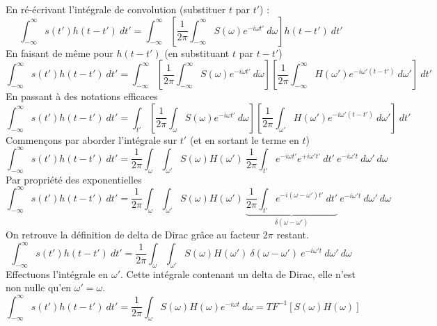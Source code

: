 En ré-écrivant l'intégrale de convolution (substituer $t$ par $t'$) :
\begin{equation}
\int_{-\infty}^\infty s(t')h(t-t')\ dt' = \int_{-\infty}^\infty \left[\dfrac{1}{2\pi}
\int_{-\infty}^\infty S(\omega)e^{-i\omega t'}\ d\omega\right]h(t-t')\ dt'
\end{equation}
En faisant de même pour $h(t-t')$ (en substituant $t$ par $t-t'$)
\begin{equation}
\int_{-\infty}^\infty s(t')h(t-t')\ dt' = \int_{-\infty}^\infty \left[\dfrac{1}{2\pi}
\int_{-\infty}^\infty S(\omega)e^{-i\omega t'}\ d\omega\right]\left[\frac{1}{2\pi}
\int_{-\infty}^\infty H(\omega')e^{-i\omega'(t-t')}\ d\omega' \right]\ dt'
\end{equation}
En passant à des notations efficaces
\begin{equation}
\int_{-\infty}^\infty s(t')h(t-t')\ dt' = \int_{t'} \left[\dfrac{1}{2\pi}
\int_{\omega} S(\omega)e^{-i\omega t'}\ d\omega\right]\left[\frac{1}{2\pi}
\int_{\omega'} H(\omega')e^{-i\omega'(t-t')}\ d\omega' \right]\ dt'
\end{equation}
Commençons par aborder l'intégrale sur $t'$ (et en sortant le terme en $t$)
\begin{equation}
\int_{-\infty}^\infty s(t')h(t-t')\ dt' = \frac{1}{2\pi}\int_\omega\int_{\omega'}
S(\omega)H(\omega')\ \frac{1}{2\pi}\int_{t'}e^{-i\omega t'}e^{+i\omega't'}\ dt'\ e^{-i
\omega' t}\ d\omega'\ d\omega
\end{equation}
Par propriété des exponentielles
\begin{equation}
\int_{-\infty}^\infty s(t')h(t-t')\ dt' = \frac{1}{2\pi}\int_\omega\int_{\omega'}
S(\omega)H(\omega')\ \underbrace{\frac{1}{2\pi}\int_{t'}e^{-i(\omega-\omega')t'}\ dt'}_{\delta
(\omega-\omega')}\ e^{-i
\omega' t}\ d\omega'\ d\omega
\end{equation}
On retrouve la définition de delta de Dirac grâce au facteur $2\pi$ restant.
\begin{equation}
\int_{-\infty}^\infty s(t')h(t-t')\ dt' = \frac{1}{2\pi}\int_\omega\int_{\omega'}
S(\omega)H(\omega')\ \delta(\omega-\omega')\ e^{-i\omega' t}\ d\omega'\ d\omega
\end{equation}
Effectuons l'intégrale en $\omega'$. Cette intégrale contenant un delta de Dirac, elle 
n'est non nulle qu'en $\omega'=\omega$. 
\begin{equation}
\int_{-\infty}^\infty s(t')h(t-t')\ dt' = \frac{1}{2\pi}\int_\omega
S(\omega)H(\omega)e^{-i\omega t}\ d\omega = TF^{-1}[S(\omega)H(\omega)]
\end{equation}
